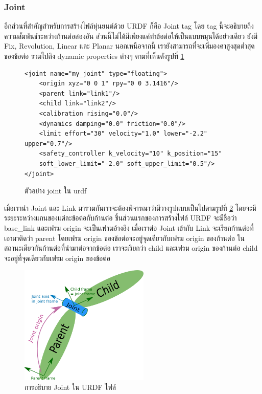 \subsubsection*{Joint}
อีกส่วนที่สำคัญสำหรับการสร้างไฟล์หุ่นยนต์ด้วย URDF ก็คือ Joint tag โดย tag นี้จะอธิบายถึงความสัมพันธ์ระหว่างก้านต่อสองอัน
ส่วนนี้ไม่ได้มีเพียงแค่ทำข้อต่อให้เป็นแบบหมุนได้อย่างเดียว ยังมี Fix, Revolution, Linear และ Planar นอกเหนือจากนี้
เรายังสามารถที่จะเพิ่มองศาสูงสุดต่ำสุดของข้อต่อ รวมไปถึง dynamic properties ต่างๆ ตามที่เห็นดังรูปที่ \ref{fig:urdf_joint_code}
\begin{figure}[h!]
\begin{Verbatim}[fontsize=\small]
<joint name="my_joint" type="floating">
	<origin xyz="0 0 1" rpy="0 0 3.1416"/>
	<parent link="link1"/>
	<child link="link2"/>
	<calibration rising="0.0"/>
	<dynamics damping="0.0" friction="0.0"/>
	<limit effort="30" velocity="1.0" lower="-2.2" upper="0.7"/>
	<safety_controller k_velocity="10" k_position="15" 
	soft_lower_limit="-2.0" soft_upper_limit="0.5"/>
</joint>
\end{Verbatim}
\caption{ตัวอย่าง joint ใน urdf}
	\label{fig:urdf_joint_code}
\end{figure}

เมื่อเรานำ Joint และ Link มารวมกันเราจะต้องพิจารณาว่ามีวางรูปแบบเป็นไปตามรูปที่ \ref{fig:urdf_joint}
โดยจะมีระยะระหว่างแกนของแต่ละข้อต่อกับก้านต่อ ชิ้นส่วนแรกของการสร้างไฟล์ URDF จะมีชื่อว่า base\_link
และเฟรม origin จะเป็นเฟรมอ้างอิง เมื่อเราต่อ Joint เข้ากับ Link จะเรียกก้านต่อที่เอามาติดว่า parent
โดยเฟรม origin ของข้อต่อจะอยู่จุดเดียวกับเฟรม origin ของก้านต่อ ในสถานะเดียวกันก้านต่อที่นำมาต่อจากข้อต่อ
เราจะเรียกว่า child และเฟรม origin ของก้านต่อ child จะอยู่ที่จุดเดียวกับเฟรม origin ของข้อต่อ

\begin{figure}[h!]
	\centering
	\includegraphics[width=0.55\textwidth]{chapter3/images/urdf_joint.png}
	\caption{การอธิบาย Joint ใน URDF ไฟล์}
	\label{fig:urdf_joint}
\end{figure}

